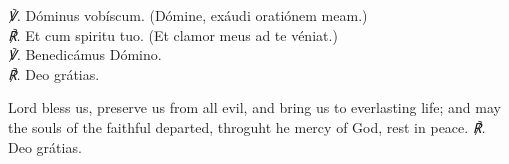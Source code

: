 {
	\textit{\scshape ℣.} Dóminus vobíscum. (Dómine, exáudi oratiónem meam.)\\
	\textit{\scshape ℟.} Et cum spiritu tuo. (Et clamor meus ad te véniat.)\\
	\textit{\scshape ℣.} Benedicámus Dómino.\\
	\textit{\scshape ℟.} Deo grátias.
}
\par\noindent
{} Lord {} bless us, preserve us from all evil, and bring us to everlasting life; and may the souls of the faithful departed, throguht he mercy of God, rest in peace.
\textit{\scshape ℟.} Deo grátias.